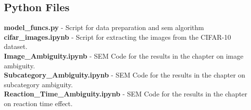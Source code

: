 \subsection*{Python Files}
\textbf{model\_funcs.py} - Script for data preparation and sem algorithm\\
\textbf{cifar\_images.ipynb} - Script for extracting the images from the CIFAR-10 dataset.\\
\textbf{Image\_Ambiguity.ipynb} - SEM Code for the results in the chapter on image ambiguity. \\
\textbf{Subcategory\_Ambiguity.ipynb} - SEM Code for the results in the chapter on subcategory ambiguity. \\
\textbf{Reaction\_Time\_Ambiguity.ipynb} - SEM Code for the results in the chapter on reaction time effect. \\